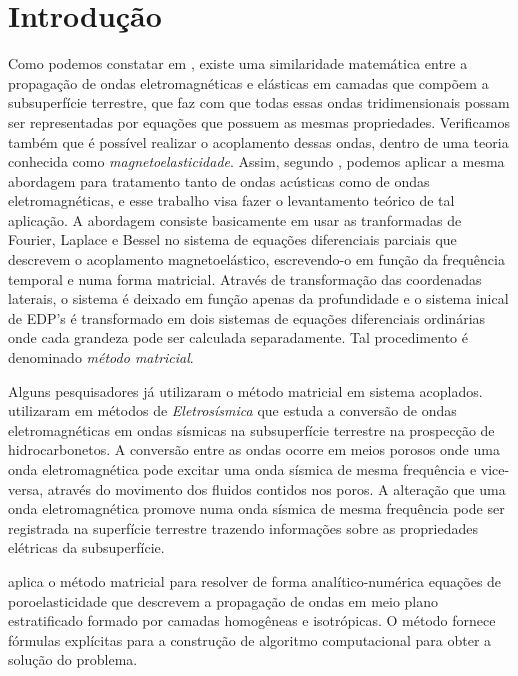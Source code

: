 \chapter{Introdu\c{c}\~ao}
Como podemos constatar em \cite{eringen_1963}, existe uma similaridade matem\'atica entre a propaga\c{c}\~ao de ondas eletromagn\'eticas e el\'asticas em camadas que comp\~oem a subsuperf\'icie terrestre, que faz com que todas essas ondas tridimensionais possam ser representadas por equa\c{c}\~oes que possuem as mesmas propriedades. Verificamos tamb\'em que \'e poss\'ivel realizar o acoplamento dessas ondas, dentro de uma teoria conhecida como \textit{magnetoelasticidade}. Assim, segundo \cite{Ursin-1983}, podemos aplicar a mesma abordagem para tratamento tanto de ondas ac\'usticas como de ondas eletromagn\'eticas, e esse trabalho visa fazer o levantamento te\'orico de tal aplica\c{c}\~ao. A abordagem consiste basicamente em usar as tranformadas de Fourier, Laplace e Bessel no sistema de equa\c{c}\~oes diferenciais parciais que descrevem o acoplamento magnetoel\'astico, escrevendo-o em fun\c{c}\~ao da frequ\^encia temporal e numa forma matricial. Atrav\'es de transforma\c{c}\~ao das coordenadas laterais, o sistema \'e deixado em fun\c{c}\~ao apenas da profundidade e o sistema inical de EDP's \'e transformado em dois sistemas de equa\c{c}\~oes diferenciais ordin\'arias onde cada grandeza pode ser calculada separadamente. Tal procedimento \'e denominado \textit{m\'etodo matricial}.

Alguns pesquisadores j\'a utilizaram o m\'etodo matricial em sistema acoplados. \cite{White_Zhou_2006} utilizaram em m\'etodos de \textit{Eletros\'ismica} que estuda a convers\~ao de ondas eletromagn\'eticas em ondas s\'ismicas na subsuperf\'icie terrestre na prospec\c{c}\~ao de hidrocarbonetos. A convers\~ao entre as ondas ocorre em meios porosos onde uma onda eletromagn\'etica pode excitar uma onda s\'ismica de mesma frequ\^encia e vice-versa, atrav\'es do movimento dos fluidos contidos nos poros. A altera\c{c}\~ao que uma onda eletromagn\'etica promove numa onda s\'ismica de mesma frequ\^encia pode ser registrada na superf\'icie terrestre trazendo informa\c{c}\~oes sobre as propriedades el\'etricas da subsuperf\'icie. 

\cite{Azeredo_2013} aplica o m\'etodo matricial para resolver de forma anal\'itico-num\'erica equa\c{c}\~oes de poroelasticidade que descrevem a propaga\c{c}\~ao de ondas em meio plano estratificado formado por camadas homog\^eneas e isotr\'opicas. O m\'etodo fornece f\'ormulas expl\'icitas para a constru\c{c}\~ao de algoritmo computacional  para obter a solu\c{c}\~ao do problema.